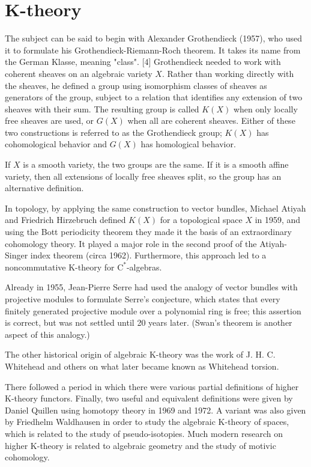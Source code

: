 
\part{K-theory}


The subject can be said to begin with Alexander Grothendieck (1957), who used it to formulate his Grothendieck-Riemann-Roch theorem. It takes its name from the German Klasse, meaning "class". [4]
Grothendieck needed to work with coherent sheaves on an algebraic variety $X$. Rather than working directly with the sheaves, he defined a group using isomorphism classes of sheaves as generators of the group, subject to a relation that identifies any extension of two sheaves with their sum. The resulting group is called $K(X)$ when only locally free sheaves are used, or $G(X)$ when all are coherent sheaves. Either of these two constructions is referred to as the Grothendieck group; $K(X)$ has cohomological behavior and $G(X)$ has homological behavior.

If $X$ is a smooth variety, the two groups are the same. If it is a smooth affine variety, then all extensions of locally free sheaves split, so the group has an alternative definition.

In topology, by applying the same construction to vector bundles, Michael Atiyah and Friedrich Hirzebruch defined $K(X)$ for a topological space $X$ in 1959, and using the Bott periodicity theorem they made it the basis of an extraordinary cohomology theory. It played a major role in the second proof of the Atiyah-Singer index theorem (circa 1962). Furthermore, this approach led to a noncommutative K-theory for $\mathrm{C}^*$-algebras.

Already in 1955, Jean-Pierre Serre had used the analogy of vector bundles with projective modules to formulate Serre's conjecture, which states that every finitely generated projective module over a polynomial ring is free; this assertion is correct, but was not settled until 20 years later. (Swan's theorem is another aspect of this analogy.)


The other historical origin of algebraic K-theory was the work of J. H. C. Whitehead and others on what later became known as Whitehead torsion.

There followed a period in which there were various partial definitions of higher K-theory functors. Finally, two useful and equivalent definitions were given by Daniel Quillen using homotopy theory in 1969 and 1972. A variant was also given by Friedhelm Waldhausen in order to study the algebraic K-theory of spaces, which is related to the study of pseudo-isotopies. Much modern research on higher K-theory is related to algebraic geometry and the study of motivic cohomology.

